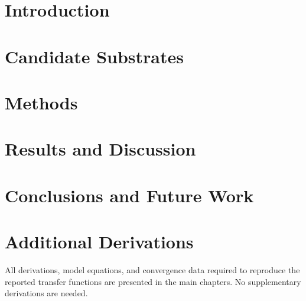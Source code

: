 \documentclass[12pt,oneside]{book}
\begin{document}
{
\clearpage
\singlespacing
\tableofcontents
\clearpage
\listoffigures
\clearpage
\listoftables
}

\begin{listofabbreviations}
\end{listofabbreviations}

\mainmatter
\pagestyle{fancy}
\fancyhead[L]{\nouppercase{\leftmark}}
\fancyhead[R]{\nouppercase{\rightmark}}

\chapter{Introduction}
\label{chap:introduction}


\chapter{Candidate Substrates}
\label{chap:substrates}



\chapter{Methods}
\label{chap:methodology}


\chapter{Results and Discussion}
\label{chap:results}


\chapter{Conclusions and Future Work}
\label{chap:conclusions}


\renewcommand{\bibname}{References}



\appendix
\chapter{Additional Derivations}
\label{app:derivations}
All derivations, model equations, and convergence data required to reproduce the reported transfer functions are presented in the main chapters. No supplementary derivations are needed.
\end{document}
